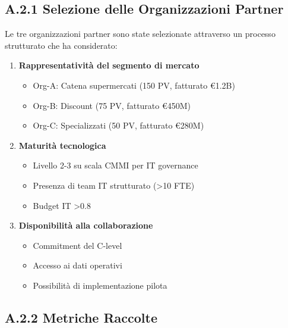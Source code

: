 \subsection{\texorpdfstring{\textbf{A.2.1 Selezione delle Organizzazioni Partner}}{A.2.1 - Selezione delle Organizzazioni Partner}}

Le tre organizzazioni partner sono state selezionate attraverso un processo strutturato che ha considerato:

\begin{enumerate}
    \item \textbf{Rappresentatività del segmento di mercato}
    \begin{itemize}
        \item Org-A: Catena supermercati (150 PV, fatturato €1.2B)
        \item Org-B: Discount (75 PV, fatturato €450M)
        \item Org-C: Specializzati (50 PV, fatturato €280M)
    \end{itemize}
    
    \item \textbf{Maturità tecnologica}
    \begin{itemize}
        \item Livello 2-3 su scala CMMI per IT governance
        \item Presenza di team IT strutturato (>10 FTE)
        \item Budget IT >0.8%
    \end{itemize}
    
    \item \textbf{Disponibilità alla collaborazione}
    \begin{itemize}
        \item Commitment del C-level
        \item Accesso ai dati operativi
        \item Possibilità di implementazione pilota
    \end{itemize}
\end{enumerate}

\subsection{\texorpdfstring{\textbf{A.2.2 Metriche Raccolte}}{A.2.2 - Metriche Raccolte}}

